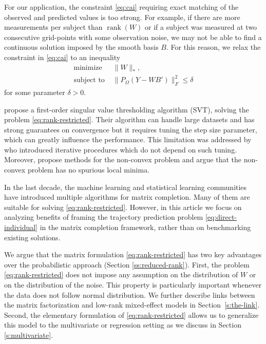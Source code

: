 \documentclass[preprint]{imsart}
\numberwithin{equation}{section}
\theoremstyle{plain}
\DeclareMathOperator*{\rank}{rank}
\begin{document}
For our application, the constraint \eqref{eq:cai} requiring exact matching of the observed and predicted values is too strong. For example, if there are more measurements per subject than $\rank(W)$ or if a subject was measured at two consecutive grid-points with some observation noise, we may not be able to find a continuous solution imposed by the smooth basis $B$. For this reason, we relax the constraint in \eqref{eq:cai} to an inequality
\begin{align}
\text{minimize\ \ } & \|W\|_*,  \nonumber\\
\text{subject to\ \ } & \| P_\Omega(Y - WB') \|_F^2 \leq \delta
\label{eq:rank-restricted}
\end{align}
for some parameter $\delta > 0$.

\citet{cai2010singular} propose a first-order singular value thresholding algorithm (SVT), solving the problem \eqref{eq:rank-restricted}. Their algorithm can handle large datasets and has strong guarantees on convergence but it requires tuning the step size parameter, which can greatly influence the performance. This limitation was addressed by \citet{ma2011fixed,mazumder2010spectral,hastie2015matrix} who introduced iterative procedures which do not depend on such tuning. Moreover, \citet{hardt2014fast,chen2015fast} propose methods for the non-convex problem and \citet{ge2016matrix} argue that the non-convex problem has no spurious local minima.

In the last decade, the machine learning and statistical learning communities have introduced multiple algorithms for matrix completion. Many of them are suitable for solving \eqref{eq:rank-restricted}. However, in this article we focus on analyzing benefits of framing the trajectory prediction problem \eqref{eq:direct-individual} in the matrix completion framework, rather than on benchmarking existing solutions.

We argue that the matrix formulation \eqref{eq:rank-restricted} has two key advantages over the probabilistic approach (Section \ref{ss:reduced-rank}). First, the problem \eqref{eq:rank-restricted} does not impose any assumption on the distribution of $W$ or on the distribution of the noise. This property is particularly important whenever the data does not follow normal distribution. We further describe links between the matrix factorization and low-rank mixed-effect models in Section~\ref{s:the-link}. Second, the elementary formulation of \eqref{eq:rank-restricted} allows us to generalize this model to the multivariate or regression setting as we discuss in Section \ref{s:multivariate}.  
\end{document}
